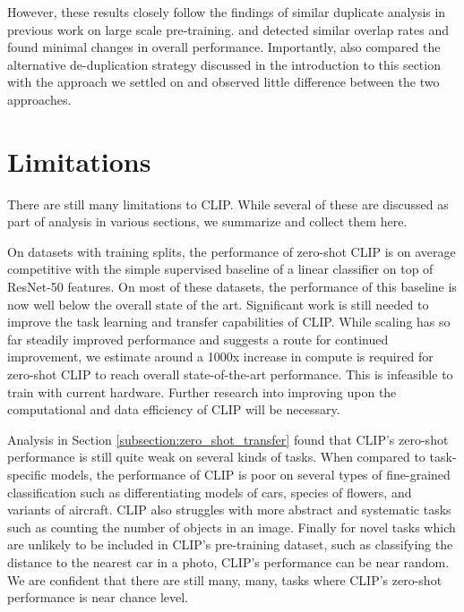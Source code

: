 \documentclass{article}
\begin{document}
However, these results closely follow the findings of similar duplicate analysis in previous work on large scale pre-training. \citet{mahajan2018exploring} and \citet{kolesnikov2019large} detected similar overlap rates and found minimal changes in overall performance. Importantly, \citet{kolesnikov2019large} also compared the alternative de-duplication strategy discussed in the introduction to this section with the approach we settled on and observed little difference between the two approaches.



\section{Limitations}

There are still many limitations to CLIP. While several of these are discussed as part of analysis in various sections, we summarize and collect them here.

On datasets with training splits, the performance of zero-shot CLIP is on average competitive with the simple supervised baseline of a linear classifier on top of ResNet-50 features. On most of these datasets, the performance of this baseline is now well below the overall state of the art. Significant work is still needed to improve the task learning and transfer capabilities of CLIP. While scaling has so far steadily improved performance and suggests a route for continued improvement, we estimate around a 1000x increase in compute is required for zero-shot CLIP to reach overall state-of-the-art performance. This is infeasible to train with current hardware. Further research into improving upon the computational and data efficiency of CLIP will be necessary.

Analysis in Section \ref{subsection:zero_shot_transfer} found that CLIP's zero-shot performance is still quite weak on several kinds of tasks. When compared to task-specific models, the performance of CLIP is poor on several types of fine-grained classification such as differentiating models of cars, species of flowers, and variants of aircraft. CLIP also struggles with more abstract and systematic tasks such as counting the number of objects in an image. Finally for novel tasks which are unlikely to be included in CLIP's pre-training dataset, such as classifying the distance to the nearest car in a photo, CLIP's performance can be near random. We are confident that there are still many, many, tasks where CLIP's zero-shot performance is near chance level.
\end{document}
